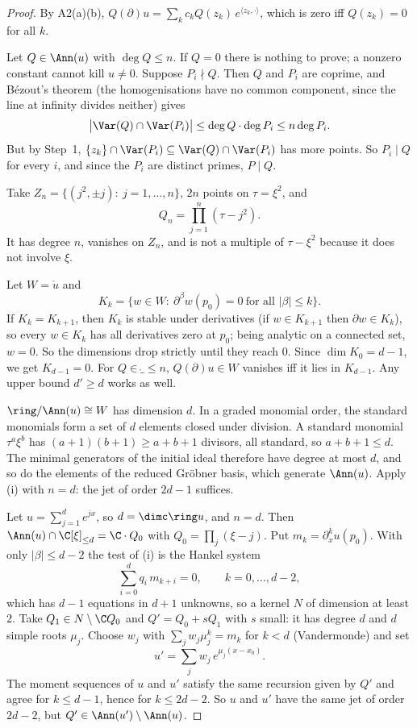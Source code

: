 \begin{proof}
By A2(a)(b), $Q(\partial)u=\sum_kc_kQ(z_k)\,e^{\langle z_k,\cdot\rangle}$, which is zero iff $Q(z_k)=0$ for all $k$.

Let $Q\in\Ann(u)$ with $\deg Q\le n$. If $Q=0$ there is nothing to prove; a nonzero constant cannot kill $u\ne0$. Suppose $P_i\nmid Q$. Then $Q$ and $P_i$ are coprime, and B\'ezout's theorem (the homogenisations have no common component, since the line at infinity divides neither) gives
\[
\big|\Var(Q)\cap\Var(P_i)\big|\le\deg Q\cdot\deg P_i\le n\deg P_i .
\]
But by Step~1, $\{z_k\}\cap\Var(P_i)\subseteq\Var(Q)\cap\Var(P_i)$ has more points. So $P_i\mid Q$ for every $i$, and since the $P_i$ are distinct primes, $P\mid Q$.

Take $Z_n=\{(j^2,\pm j):\ j=1,\dots,n\}$, $2n$ points on $\tau=\xi^2$, and
\[
Q_n=\prod_{j=1}^n(\tau-j^2).
\]
It has degree $n$, vanishes on $Z_n$, and is not a multiple of $\tau-\xi^2$ because it does not involve $\xi$.

Let $W=\ring u$ and
\[
K_k=\{w\in W:\ \partial^\beta w(p_0)=0\ \text{for all }|\beta|\le k\}.
\]
If $K_k=K_{k+1}$, then $K_k$ is stable under derivatives (if $w\in K_{k+1}$ then $\partial w\in K_k$), so every $w\in K_k$ has all derivatives zero at $p_0$; being analytic on a connected set, $w=0$. So the dimensions drop strictly until they reach $0$. Since $\dim K_0=d-1$, we get $K_{d-1}=0$. For $Q\in\ring_{\le n}$, $Q(\partial)u\in W$ vanishes iff it lies in $K_{d-1}$. Any upper bound $d'\ge d$ works as well.

$\ring/\Ann(u)\cong W$ has dimension $d$. In a graded monomial order, the standard monomials form a set of $d$ elements closed under division. A standard monomial $\tau^a\xi^b$ has $(a+1)(b+1)\ge a+b+1$ divisors, all standard, so $a+b+1\le d$. The minimal generators of the initial ideal therefore have degree at most $d$, and so do the elements of the reduced Gr\"obner basis, which generate $\Ann(u)$. Apply (i) with $n=d$: the jet of order $2d-1$ suffices.

Let $u=\sum_{j=1}^de^{jx}$, so $d=\dimc\ring u$, and $n=d$. Then $\Ann(u)\cap\C[\xi]_{\le d}=\C\cdot Q_0$ with $Q_0=\prod_j(\xi-j)$. Put $m_k=\partial_x^ku(p_0)$. With only $|\beta|\le d-2$ the test of (i) is the Hankel system
\[
\sum_{i=0}^dq_i\,m_{k+i}=0,\qquad k=0,\dots,d-2,
\]
which has $d-1$ equations in $d+1$ unknowns, so a kernel $N$ of dimension at least $2$. Take $Q_1\in N\setminus\C Q_0$ and $Q'=Q_0+sQ_1$ with $s$ small: it has degree $d$ and $d$ simple roots $\mu_j$. Choose $w_j$ with $\sum_jw_j\mu_j^k=m_k$ for $k<d$ (Vandermonde) and set
\[
u'=\sum_jw_j\,e^{\mu_j(x-x_0)}.
\]
The moment sequences of $u$ and $u'$ satisfy the same recursion given by $Q'$ and agree for $k\le d-1$, hence for $k\le2d-2$. So $u$ and $u'$ have the same jet of order $2d-2$, but $Q'\in\Ann(u')\setminus\Ann(u)$.


\end{proof}

